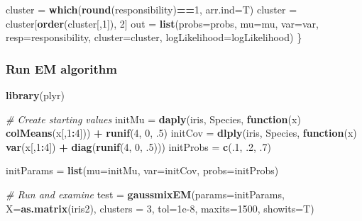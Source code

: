 \documentclass[
]{article}
\newenvironment{Shaded}{\begin{snugshade}}{\end{snugshade}}
\newcommand{\AttributeTok}[1]{\textcolor[rgb]{0.13,0.29,0.53}{#1}}
\newcommand{\CommentTok}[1]{\textcolor[rgb]{0.56,0.35,0.01}{\textit{#1}}}
\newcommand{\ControlFlowTok}[1]{\textcolor[rgb]{0.13,0.29,0.53}{\textbf{#1}}}
\newcommand{\DecValTok}[1]{\textcolor[rgb]{0.00,0.00,0.81}{#1}}
\newcommand{\FloatTok}[1]{\textcolor[rgb]{0.00,0.00,0.81}{#1}}
\newcommand{\FunctionTok}[1]{\textcolor[rgb]{0.13,0.29,0.53}{\textbf{#1}}}
\newcommand{\NormalTok}[1]{#1}
\newcommand{\OtherTok}[1]{\textcolor[rgb]{0.56,0.35,0.01}{#1}}
\newcommand{\SpecialCharTok}[1]{\textcolor[rgb]{0.81,0.36,0.00}{\textbf{#1}}}
\newcommand{\StringTok}[1]{\textcolor[rgb]{0.31,0.60,0.02}{#1}}
\begin{document}
\begin{Shaded}
\begin{Highlighting}[]
\NormalTok{  cluster }\OtherTok{=} \FunctionTok{which}\NormalTok{(}\FunctionTok{round}\NormalTok{(responsibility)}\SpecialCharTok{==}\DecValTok{1}\NormalTok{, }\AttributeTok{arr.ind=}\NormalTok{T)}
\NormalTok{  cluster }\OtherTok{=}\NormalTok{ cluster[}\FunctionTok{order}\NormalTok{(cluster[,}\DecValTok{1}\NormalTok{]), }\DecValTok{2}\NormalTok{]}
\NormalTok{  out }\OtherTok{=} \FunctionTok{list}\NormalTok{(}\AttributeTok{probs=}\NormalTok{probs, }\AttributeTok{mu=}\NormalTok{mu, }\AttributeTok{var=}\NormalTok{var, }\AttributeTok{resp=}\NormalTok{responsibility, }\AttributeTok{cluster=}\NormalTok{cluster, }\AttributeTok{logLikelihood=}\NormalTok{logLikelihood)}
\NormalTok{\} }
\end{Highlighting}
\end{Shaded}

\subsubsection{Run EM algorithm}\label{run-em-algorithm}

\begin{Shaded}
\begin{Highlighting}[]
\FunctionTok{library}\NormalTok{(plyr)}

\CommentTok{\# Create starting values}
\NormalTok{initMu }\OtherTok{=} \FunctionTok{daply}\NormalTok{(iris, }\StringTok{\textquotesingle{}Species\textquotesingle{}}\NormalTok{, }\ControlFlowTok{function}\NormalTok{(x) }\FunctionTok{colMeans}\NormalTok{(x[,}\DecValTok{1}\SpecialCharTok{:}\DecValTok{4}\NormalTok{])) }\SpecialCharTok{+} \FunctionTok{runif}\NormalTok{(}\DecValTok{4}\NormalTok{, }\DecValTok{0}\NormalTok{, .}\DecValTok{5}\NormalTok{)}
\NormalTok{initCov }\OtherTok{=} \FunctionTok{dlply}\NormalTok{(iris, }\StringTok{\textquotesingle{}Species\textquotesingle{}}\NormalTok{, }\ControlFlowTok{function}\NormalTok{(x) }\FunctionTok{var}\NormalTok{(x[,}\DecValTok{1}\SpecialCharTok{:}\DecValTok{4}\NormalTok{]) }\SpecialCharTok{+} \FunctionTok{diag}\NormalTok{(}\FunctionTok{runif}\NormalTok{(}\DecValTok{4}\NormalTok{, }\DecValTok{0}\NormalTok{, .}\DecValTok{5}\NormalTok{)))}
\NormalTok{initProbs }\OtherTok{=} \FunctionTok{c}\NormalTok{(.}\DecValTok{1}\NormalTok{, .}\DecValTok{2}\NormalTok{, .}\DecValTok{7}\NormalTok{)}

\NormalTok{initParams }\OtherTok{=} \FunctionTok{list}\NormalTok{(}\AttributeTok{mu=}\NormalTok{initMu, }\AttributeTok{var=}\NormalTok{initCov, }\AttributeTok{probs=}\NormalTok{initProbs)  }

\CommentTok{\# Run and examine}
\NormalTok{test }\OtherTok{=} \FunctionTok{gaussmixEM}\NormalTok{(}\AttributeTok{params=}\NormalTok{initParams, }\AttributeTok{X=}\FunctionTok{as.matrix}\NormalTok{(iris2), }\AttributeTok{clusters =} \DecValTok{3}\NormalTok{, }\AttributeTok{tol=}\FloatTok{1e{-}8}\NormalTok{, }\AttributeTok{maxits=}\DecValTok{1500}\NormalTok{, }\AttributeTok{showits=}\NormalTok{T)}
\end{Highlighting}
\end{Shaded}
\end{document}
